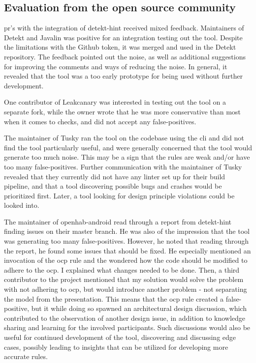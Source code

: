\documentclass{report}
\begin{document}
\subsection{Evaluation from the open source community}

\gls{pr}'s with the integration of detekt-hint received mixed feedback. Maintainers of Detekt and Javalin was positive for an integration testing out the tool. Despite the limitations with the Github token, it was merged and used in the Detekt repository. The feedback pointed out the noise, as well as additional suggestions for improving the comments and ways of reducing the noise. In general, it revealed that the tool was a too early prototype for being used without further development.

One contributor of Leakcanary was interested in testing out the tool on a separate fork, while the owner wrote that he was more conservative than most when it comes to checks, and did not accept any false-positives. 

The maintainer of Tusky\cite{tusky} ran the tool on the codebase using the \gls{cli} and did not find the tool particularly useful, and were generally concerned that the tool would generate too much noise. This may be a sign that the rules are weak and/or have too many false-positives. Further communication with the maintainer of Tusky revealed that they currently did not have any linter set up for their build pipeline, and that a tool discovering possible bugs and crashes would be prioritized first. Later, a tool looking for design principle violations could be looked into.

The maintainer of openhab-android\cite{openhab} read through a report from detekt-hint finding issues on their master branch. He was also of the impression that the tool was generating too many false-positives. However, he noted that reading through the report, he found some issues that should be fixed. He especially mentioned an invocation of the \gls{ocp} rule and the wondered how the code should be modified to adhere to the \gls{ocp}. I explained what changes needed to be done. Then, a third contributor to the project mentioned that my solution would solve the problem with not adhering to \gls{ocp}, but would introduce another problem - not separating the model from the presentation. This means that the \gls{ocp} rule created a false-positive, but it while doing so spawned an architectural design discussion, which contributed to the observation of another design issue, in addition to knowledge sharing and learning for the involved participants. Such discussions would also be useful for continued development of the tool, discovering and discussing edge cases, possibly leading to insights that can be utilized for developing more accurate rules. 
\end{document}
